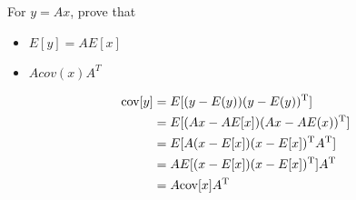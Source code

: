 \documentclass{scrartcl}
\begin{document}
    For \(y = Ax\), prove that
    \begin{itemize}
        \item \(E[y] = AE[x]\)
        \item \(A cov(x) A^{T}\)
    \end{itemize}

    \begin{align*}
        \textnormal{cov}[y] &= E[(y - E(y))(y - E(y))^\textnormal{T}]\\
        &= E[(Ax-AE[x])(Ax-AE(x))^\textnormal{T}]\\
        &= E[A(x-E[x])(x-E[x])^\textnormal{T}A^\textnormal{T}]\\
        &= AE[(x-E[x])(x-E[x])^\textnormal{T}]A^\textnormal{T}\\
        &= A\textnormal{cov}[x]A^\textnormal{T}
    \end{align*}
\end{document}
